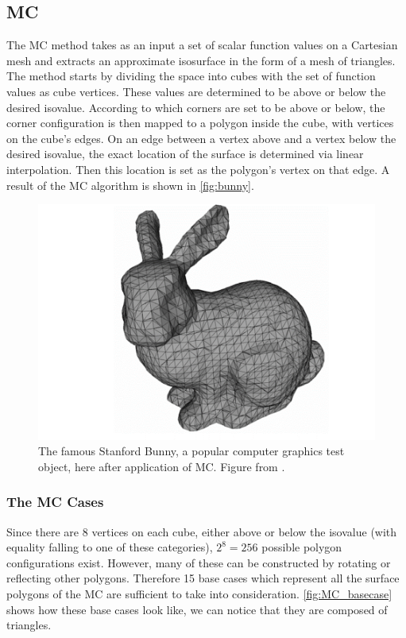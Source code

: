 \subsection{\Acl{MC}} 
The \acf{MC} method \cite{Marching2006} takes as an input a set of scalar function values on a Cartesian mesh and extracts an approximate isosurface in the form of a mesh of triangles. The method starts by dividing the space into cubes with the set of function values as cube vertices. These values are determined to be above or below the desired isovalue. According to which corners are set to be above or below, the corner configuration is then mapped to a polygon inside the cube, with vertices on the cube's edges. On an edge between a vertex above and a vertex below the desired isovalue, the exact location of the surface is determined via linear interpolation. Then this location is set as the polygon's vertex on that edge. A result of the \ac{MC} algorithm is shown in \autoref{fig:bunny}.

\begin{figure}
\centering
   \includegraphics[width=.25\textwidth]{Pictures/SurfaceReconstruction/new_bunny.png}
   \caption{The famous Stanford Bunny, a popular computer graphics test object, here after application of \ac{MC}. Figure from \cite{NielsonParametrization}. }
   \label{fig:bunny}
\end{figure}

\subsubsection{The \acl{MC} Cases}
Since there are 8 vertices on each cube, either above or below the isovalue (with equality falling to one of these categories), $2^8=256$ possible polygon configurations exist. However, many of these can be constructed by rotating or reflecting other polygons. Therefore 15 base cases which represent all the surface polygons of the \acl{MC} are sufficient to take into consideration. \autoref{fig:MC_basecase} shows how these base cases look like, we can notice that they are composed of triangles. 

